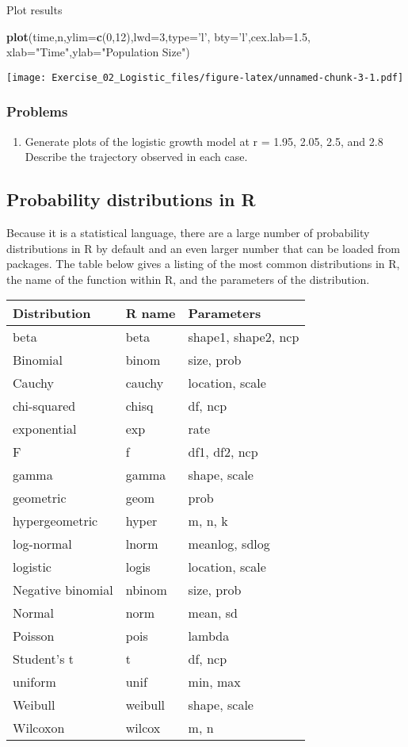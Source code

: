 \documentclass[]{article}
\newenvironment{Shaded}{\begin{snugshade}}{\end{snugshade}}
\newcommand{\KeywordTok}[1]{\textcolor[rgb]{0.13,0.29,0.53}{\textbf{#1}}}
\newcommand{\DataTypeTok}[1]{\textcolor[rgb]{0.13,0.29,0.53}{#1}}
\newcommand{\DecValTok}[1]{\textcolor[rgb]{0.00,0.00,0.81}{#1}}
\newcommand{\FloatTok}[1]{\textcolor[rgb]{0.00,0.00,0.81}{#1}}
\newcommand{\StringTok}[1]{\textcolor[rgb]{0.31,0.60,0.02}{#1}}
\newcommand{\NormalTok}[1]{#1}
\providecommand{\tightlist}{%
  \setlength{\itemsep}{0pt}\setlength{\parskip}{0pt}}
\begin{document}
Plot results

\begin{Shaded}
\begin{Highlighting}[]
\KeywordTok{plot}\NormalTok{(time,n,}\DataTypeTok{ylim=}\KeywordTok{c}\NormalTok{(}\DecValTok{0}\NormalTok{,}\DecValTok{12}\NormalTok{),}\DataTypeTok{lwd=}\DecValTok{3}\NormalTok{,}\DataTypeTok{type=}\StringTok{'l'}\NormalTok{,}
     \DataTypeTok{bty=}\StringTok{'l'}\NormalTok{,}\DataTypeTok{cex.lab=}\FloatTok{1.5}\NormalTok{,}
     \DataTypeTok{xlab=}\StringTok{"Time"}\NormalTok{,}\DataTypeTok{ylab=}\StringTok{"Population Size"}\NormalTok{)}
\end{Highlighting}
\end{Shaded}

\texttt{[image: Exercise\_02\_Logistic\_files/figure-latex/unnamed-chunk-3-1.pdf]}

\subsubsection{Problems}\label{problems}

\begin{enumerate}
\def\labelenumi{\arabic{enumi}.}
\tightlist
\item
  Generate plots of the logistic growth model at r = 1.95, 2.05, 2.5,
  and 2.8 Describe the trajectory observed in each case.
\end{enumerate}

\subsection{Probability distributions in
R}\label{probability-distributions-in-r}

Because it is a statistical language, there are a large number of
probability distributions in R by default and an even larger number that
can be loaded from packages. The table below gives a listing of the most
common distributions in R, the name of the function within R, and the
parameters of the distribution.

\begin{longtable}[]{@{}lll@{}}
\toprule
Distribution & R name & Parameters\tabularnewline
\midrule
\endhead
beta & beta & shape1, shape2, ncp\tabularnewline
Binomial & binom & size, prob\tabularnewline
Cauchy & cauchy & location, scale\tabularnewline
chi-squared & chisq & df, ncp\tabularnewline
exponential & exp & rate\tabularnewline
F & f & df1, df2, ncp\tabularnewline
gamma & gamma & shape, scale\tabularnewline
geometric & geom & prob\tabularnewline
hypergeometric & hyper & m, n, k\tabularnewline
log-normal & lnorm & meanlog, sdlog\tabularnewline
logistic & logis & location, scale\tabularnewline
Negative binomial & nbinom & size, prob\tabularnewline
Normal & norm & mean, sd\tabularnewline
Poisson & pois & lambda\tabularnewline
Student's t & t & df, ncp\tabularnewline
uniform & unif & min, max\tabularnewline
Weibull & weibull & shape, scale\tabularnewline
Wilcoxon & wilcox & m, n\tabularnewline
\bottomrule
\end{longtable}
\end{document}
